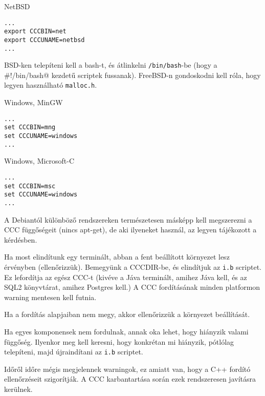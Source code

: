 NetBSD
\begin{verbatim}
...
export CCCBIN=net
export CCCUNAME=netbsd
...
\end{verbatim}

BSD-ken telepíteni kell a bash-t, és átlinkelni \verb!/bin/bash!-be (hogy a
\verb@#!/bin/bash@ kezdetű scriptek fussanak). FreeBSD-n gondoskodni kell róla,
hogy legyen használható \verb!malloc.h!.


Windows, MinGW
\begin{verbatim}
...
set CCCBIN=mng
set CCCUNAME=windows
...
\end{verbatim}

Windows, Microsoft-C
\begin{verbatim}
...
set CCCBIN=msc
set CCCUNAME=windows
...
\end{verbatim}

A Debiantól különböző rendszereken természetesen másképp kell megszerezni
a CCC függőségeit (nincs apt-get), de aki ilyeneket használ, 
az legyen tájékozott a kérdésben.

Ha most elindítunk egy terminált, abban a fent beállított környezet lesz érvényben
(ellenőrizzük). Bemegyünk a CCCDIR-be, és elindítjuk az \verb!i.b! scriptet. 
Ez lefordítja az egész CCC-t (kivéve a Jáva terminált, amihez Jáva kell, 
és az SQL2 könyvtárat, amihez Postgres kell.) 
A CCC fordításának minden platformon warning mentesen kell futnia.

Ha a fordítás alapjaiban nem megy, akkor ellenőrizzük a környezet beállítását.

Ha egyes komponensek nem fordulnak, annak oka lehet, hogy hiányzik valami
függőség. Ilyenkor meg kell keresni, hogy konkrétan mi hiányzik, pótlólag telepíteni,
majd újraindítani az \verb!i.b! scriptet.

Időről időre mégis megjelennek warningok, ez amiatt van, hogy a C++ fordító 
ellenőrzéseit szigorítják. A CCC karbantartása során ezek rendszeresen javításra 
kerülnek.




